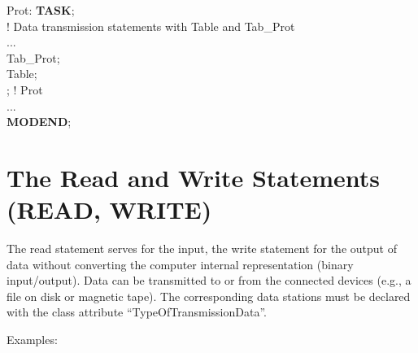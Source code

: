 Prot: {\bf TASK};\\
\x ! Data transmission statements with Table and Tab\_Prot\\
\x ...\\
 Tab\_Prot;\\
 Table; \\
; ! Prot \\
... \\
{\bf MODEND};

\section{The Read and Write Statements (READ, WRITE)}   %
\label{sec_read_write}

The read statement serves for the input, the write statement for the
output of data without converting the computer internal representation
(binary input/output). Data can be transmitted to or from the connected
devices (e.g., a file on disk or magnetic tape). The corresponding data
stations must be declared with the class attribute
``TypeOfTransmissionData''.

Examples:

